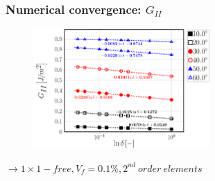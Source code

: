 \documentclass[first,firstsupp,lastsupp,last,hyperref,table]{ETHclass}
\begin{document}
%
%
%

%

\begin{frame}
\frametitle{\vspace{0.25cm}\small Numerical convergence: $G_{II}$}
\vspace{-.75cm}
\centering
\begin{figure}
\centering
\includegraphics[width=0.6\textwidth]{Vf0_1-free-2nd-semilogvsDelta-GII.pdf}
\end{figure}
$\rightarrow 1\times1-free, V_{f}=0.1\%, 2^{nd}\ order\ elements$ 
\end{frame}
\end{document}
